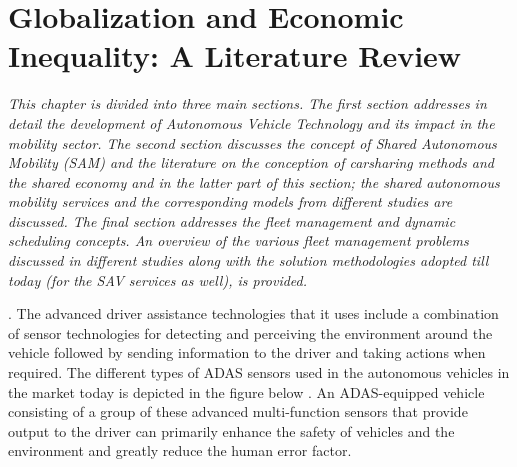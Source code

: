 \chapter{Globalization and Economic Inequality: A Literature Review} \label{chapter:literatureReview}
\textit{This chapter is divided into three main sections. The first section addresses in detail the development of Autonomous Vehicle Technology and its impact in the mobility sector. The second section discusses the concept of Shared Autonomous Mobility (SAM) and the literature on the conception of carsharing methods and the shared economy and in the latter part of this section; the shared autonomous mobility services and the corresponding models from different studies are discussed. The final section addresses the fleet management and dynamic scheduling concepts. An overview of the various fleet management problems discussed in different studies along with the solution methodologies adopted till today (for the SAV services as well), is provided.}


. The advanced driver assistance technologies that it uses include a combination of sensor technologies for detecting and perceiving the environment around the vehicle followed by sending information to the driver and taking actions when required. The different types of ADAS sensors used in the autonomous vehicles in the market today is depicted in the figure below \citep{2021whatisadas}. An ADAS-equipped vehicle consisting of a group of these advanced multi-function sensors that provide output to the driver can primarily enhance the safety of vehicles and the environment and greatly reduce the human error factor.

